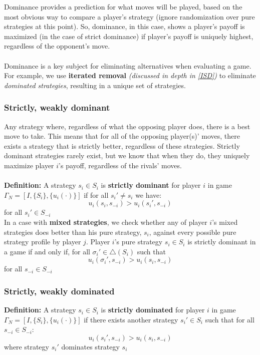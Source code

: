\documentclass{article}
\begin{document}
\noindent Dominance provides a prediction for what moves will be played, based on the most obvious way to compare a player's strategy (ignore randomization over pure strategies at this point). So, dominance, in this case, shows a player's payoff is maximized (in the case of strict dominance) if player's payoff is uniquely highest, regardless of the opponent's move. \\ 
\\
Dominance is a key subject for eliminating alternatives when evaluating a game. For example, we use \textbf{iterated removal} \textit{(discussed in depth in \ref{ISD})} to eliminate \textit{dominated strategies}, resulting in a unique set of strategies. \\

\subsubsection{Strictly, weakly dominant}
Any strategy where, regardless of what the opposing player does, there is a best move to take. This means that for all of the opposing player(s)' moves, there exists a strategy that is strictly better, regardless of these strategies. Strictly dominant strategies rarely exist, but we know that when they do, they uniquely maximize player $i$'s payoff, regardless of the rivals' moves. \\
\\
\noindent \textbf{Definition:} A strategy $s_i \in S_i$ is \textbf{strictly dominant} for player $i$ in game $\Gamma_N = [I, \{S_i\}, \{u_{i}(\cdot)\}]$ if for all $s_{i}' \neq s_i$ we have: \[
u_{i}(s_{i}, s_{-i}) > u_{i}(s_{i}', s_{-i})
\] 
for all $s_{i}' \in S_{-i}$ \\

\noindent In a case with \textbf{mixed strategies}, we check whether any of player $i$'s mixed strategies does better than his pure strategy, $s_i$, against every possible pure strategy profile by player $j$. Player $i$'s pure strategy $s_i \in S_i$ is strictly dominant in a game if and only if, for all $\sigma_{i}' \in \triangle(S_i)$ such that \[
u_{i}(\sigma_{i}', s_{-i}) > u_{i}(s_{i}, s_{-i})
\]
for all $s_{-i} \in S_{-i}$
 
\subsubsection{Strictly, weakly dominated}

\noindent \textbf{Definition:} A strategy $s_i \in S_i$ is \textbf{strictly dominated }for player $i$ in game $\Gamma_N = [I, \{S_i\}, \{u_{i}(\cdot)\}]$ if there exists another strategy $s_{i}' \in S_i$ such that for all $s_{-i} \in S_{-i}$: \[
u_{i}(s_{i}', s_{-i}) > u_{i}(s_{i}, s_{-i})
\] 
where strategy $s_{i}'$ dominates strategy $s_i$
\end{document}
